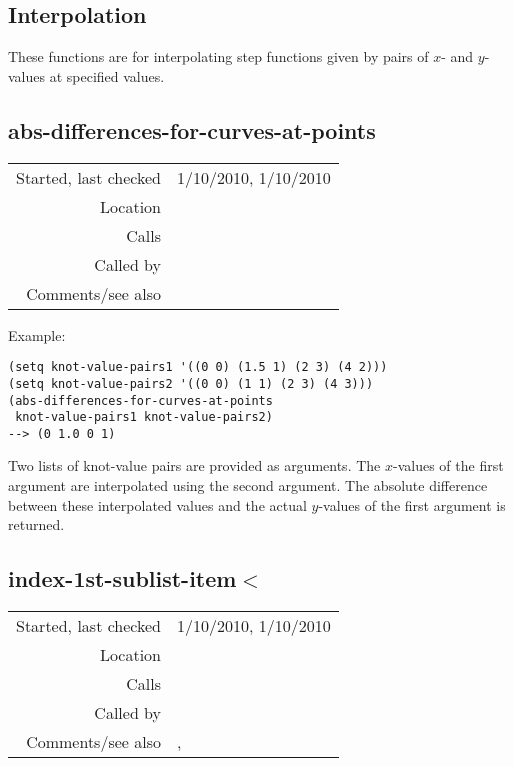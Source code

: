 \subsection{Interpolation}\label{sec:interpolation}

These functions are for interpolating step functions
given by pairs of $x$- and $y$-values at specified
values.


\subsection*{abs-differences-for-curves-at-points}\label{fun:abs-differences-for-curves-at-points}

\vspace{0.3cm}
\begin{tabular}{r|p{8cm}}
Started, last checked & 1/10/2010, 1/10/2010 \\
Location & \nameref{sec:interpolation} \\
Calls & \nameref{fun:linearly-interpolate} \\
Called by & \\
Comments/see also & 
\end{tabular}

\vspace{0.5cm}
\noindent Example:
\begin{verbatim}
(setq knot-value-pairs1 '((0 0) (1.5 1) (2 3) (4 2)))
(setq knot-value-pairs2 '((0 0) (1 1) (2 3) (4 3)))
(abs-differences-for-curves-at-points
 knot-value-pairs1 knot-value-pairs2)
--> (0 1.0 0 1)
\end{verbatim}

\noindent Two lists of knot-value pairs are provided
as arguments. The $x$-values of the first argument are
interpolated using the second argument. The absolute
difference between these interpolated values and the
actual $y$-values of the first argument is
returned.


\subsection*{index-1st-sublist-item$<$}\label{fun:index-1st-sublist-item<}

\vspace{0.3cm}
\begin{tabular}{r|p{8cm}}
Started, last checked & 1/10/2010, 1/10/2010 \\
Location & \nameref{sec:interpolation} \\
Calls & \\
Called by & \\
Comments/see also & \nameref{fun:index-nth-sublist-item<}, 
\newline \nameref{fun:index-1st-sublist-item<=}
\end{tabular}

